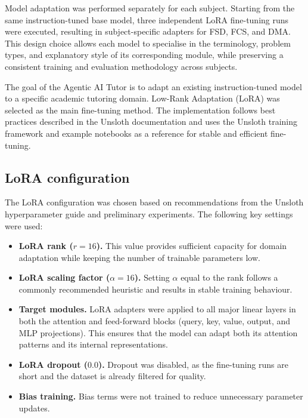 Model adaptation was performed separately for each subject. Starting from the same instruction-tuned
base model, three independent LoRA fine-tuning runs were executed, resulting in subject-specific
adapters for FSD, FCS, and DMA. This design choice allows each model to specialise in the terminology, problem types, and explanatory style of its corresponding module, while preserving a consistent training and evaluation methodology across subjects.

The goal of the Agentic AI Tutor is to adapt an existing instruction-tuned model to a specific academic tutoring domain. Low-Rank Adaptation (LoRA) was selected as the main fine-tuning method. The implementation follows best practices described in the Unsloth documentation \parencite{LoRAfine55:online} and uses the Unsloth training framework and example notebooks \parencite{GitHubun10:online} as a reference for stable and efficient fine-tuning.

\subsection{LoRA configuration}

The LoRA configuration was chosen based on recommendations from the Unsloth hyperparameter guide \parencite{LoRAfine55:online} and preliminary experiments. The following key settings were used:

\begin{itemize}
    \item \textbf{LoRA rank ($r=16$).} This value provides sufficient capacity for domain adaptation while keeping the number of trainable parameters low.
    \item \textbf{LoRA scaling factor ($\alpha=16$).} Setting $\alpha$ equal to the rank follows a commonly recommended heuristic and results in stable training behaviour.
    \item \textbf{Target modules.} LoRA adapters were applied to all major linear layers in both the attention and feed-forward blocks (query, key, value, output, and MLP projections). This ensures that the model can adapt both its attention patterns and its internal representations.
    \item \textbf{LoRA dropout ($0.0$).} Dropout was disabled, as the fine-tuning runs are short and the dataset is already filtered for quality.
    \item \textbf{Bias training.} Bias terms were not trained to reduce unnecessary parameter updates.
\end{itemize}


